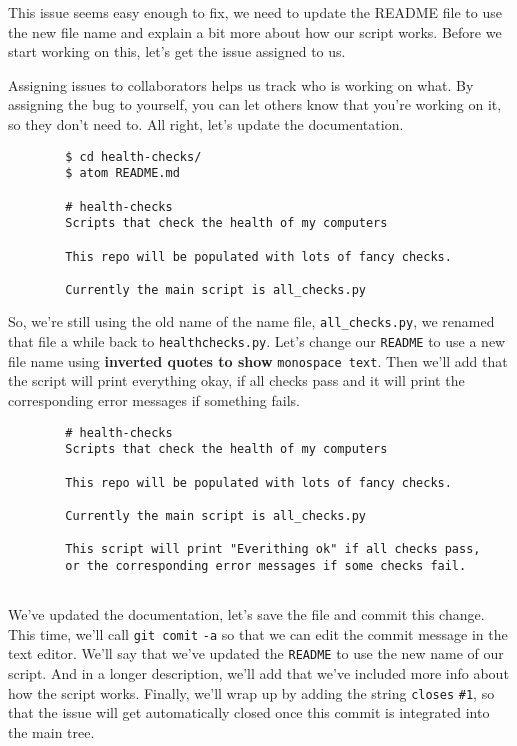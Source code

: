 	This issue seems easy enough to fix, we need to update the README file to use the new file name and explain a bit more about how our script works. Before we start working on this, let's get the issue assigned to us.

	Assigning issues to collaborators helps us track who is working on what. By assigning the bug to yourself, you can let others know that you're working on it, so they don't need to. All right, let's update the documentation.
	
	\begin{verbatim}
		$ cd health-checks/
		$ atom README.md
		
		# health-checks
		Scripts that check the health of my computers
		
		This repo will be populated with lots of fancy checks.
		
		Currently the main script is all_checks.py
	\end{verbatim}

	So, we're still using the old name of the name file, \verb|all_checks.py|, we renamed that file a while back to \verb|healthchecks.py|. Let's change our \texttt{README} to use a new file name using \textbf{inverted quotes to show} \texttt{monospace text}. Then we'll add that the script will print everything okay, if all checks pass and it will print the corresponding error messages if something fails.
	
	\begin{verbatim}
		# health-checks
		Scripts that check the health of my computers
		
		This repo will be populated with lots of fancy checks.
		
		Currently the main script is all_checks.py
		
		This script will print "Everithing ok" if all checks pass,
		or the corresponding error messages if some checks fail.
		
	\end{verbatim}

	We've updated the documentation, let's save the file and commit this change. This time, we'll call \texttt{git comit} \verb|-a| so that we can edit the commit message in the text editor. We'll say that we've updated the \texttt{README} to use the new name of our script. And in a longer description, we'll add that we've included more info about how the script works. Finally, we'll wrap up by adding the string \texttt{closes} \verb|#1|, so that the issue will get automatically closed once this commit is integrated into the main tree.
	
